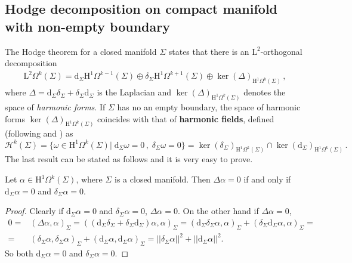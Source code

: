 \subsection{Hodge decomposition on compact manifold with non-empty boundary}
The Hodge theorem for a closed manifold $\Sigma$ states that there is an $\mathrm{L}^2$-orthogonal decomposition
\begin{align}\label{Eqn: Hodge decomposition on closed manifolds}
	\mathrm{L}^2\Omega^k(\Sigma)=\mathrm{d}_\Sigma \mathrm{H}^1\Omega^{k-1}(\Sigma)\oplus\delta_\Sigma \mathrm{H}^1\Omega^{k+1}(\Sigma)\oplus\ker(\Delta)_{\mathrm{H}^1\Omega^k(\Sigma)}\,,
\end{align}
where $\Delta=\mathrm{d}_\Sigma\delta_\Sigma+\delta_\Sigma\mathrm{d}_\Sigma$ is the Laplacian and $\ker(\Delta)_{\mathrm{H}^1\Omega^k(\Sigma)}$ denotes the space of \emph{harmonic forms}.
If $\Sigma$ has no an empty boundary, the space of harmonic forms $\ker(\Delta)_{\mathrm{H}^1\Omega^k(\Sigma)}$ coincides with that of \textbf{harmonic fields}, defined (following \cite{Kodaira-49} and \cite{Schwarz-95}) as
\begin{equation}\label{Eqn: harmonic fields}
	\mathcal{H}^k(\Sigma)=\lbrace\omega\in \mathrm{H}^1\Omega^k(\Sigma)|\;\mathrm{d}_\Sigma\omega=0\,,\;\delta_\Sigma\omega=0\rbrace=\ker(\delta_\Sigma)_{\mathrm{H}^1\Omega^k(\Sigma)}\cap\ker(\mathrm{d}_\Sigma)_{\mathrm{H}^1\Omega^k(\Sigma)}\,.
\end{equation}
The last result can be stated as follows and it is very easy to prove.
\begin{proposition}
	Let $\alpha\in\mathrm{H}^1\Omega^k(\Sigma)$, where $\Sigma$ is a closed manifold. Then $\Delta\alpha=0$ if and only if $\mathrm{d}_\Sigma\alpha=0$ and $\delta_\Sigma\alpha=0$.
\end{proposition}
\begin{proof}
	Clearly if $\mathrm{d}_\Sigma\alpha=0$ and $\delta_\Sigma\alpha=0$, $\Delta\alpha=0$. On the other hand if $\Delta\alpha=0$,
	\begin{align}
		0=&\left(\Delta\alpha,\alpha\right)_\Sigma=\left((\mathrm{d}_\Sigma\delta_\Sigma+\delta_\Sigma\mathrm{d}_\Sigma)\alpha,\alpha\right)_\Sigma=\left(\mathrm{d}_\Sigma\delta_\Sigma\alpha,\alpha\right)_\Sigma+\left(\delta_\Sigma\mathrm{d}_\Sigma\alpha,\alpha\right)_\Sigma=\\
		=&\left(\delta_\Sigma\alpha,\delta_\Sigma\alpha\right)_\Sigma+\left(\mathrm{d}_\Sigma\alpha,\mathrm{d}_\Sigma\alpha\right)_\Sigma=||\delta_\Sigma\alpha||^2+||\mathrm{d}_\Sigma\alpha||^2.
	\end{align}
	So both $\mathrm{d}_\Sigma\alpha=0$ and $\delta_\Sigma\alpha=0$.
\end{proof}
